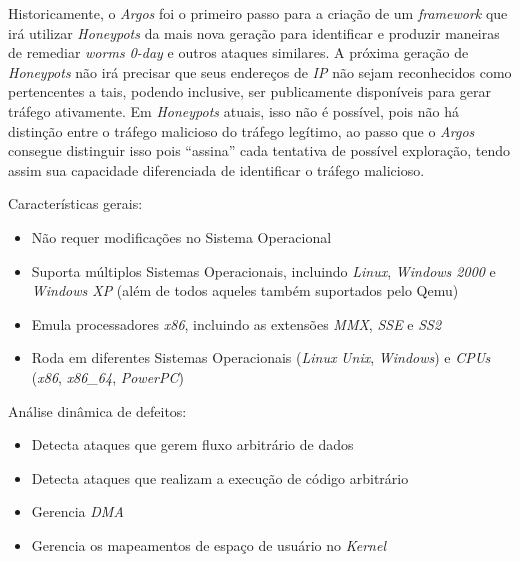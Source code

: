 Historicamente, o \textit{Argos} foi o primeiro passo para a criação de um \textit{framework} que irá utilizar \textit{Honeypots} da mais nova geração para identificar e produzir maneiras de remediar \textit{worms 0-day} e outros ataques similares. A próxima geração de \textit{Honeypots} não irá precisar que seus endereços de \textit{IP} não sejam reconhecidos como pertencentes a tais, podendo inclusive, ser publicamente disponíveis para gerar tráfego ativamente. Em \textit{Honeypots} atuais, isso não é possível, pois não há distinção entre o tráfego malicioso do tráfego legítimo, ao passo que o \textit{Argos} consegue distinguir isso pois ``assina'' cada tentativa de possível exploração, tendo assim sua capacidade diferenciada de identificar o tráfego malicioso.

Características gerais:
\begin{itemize}
    \item Não requer modificações no Sistema Operacional
    \item Suporta múltiplos Sistemas Operacionais, incluindo \textit{Linux}, \textit{Windows 2000} e \textit{Windows XP} (além de todos aqueles também suportados pelo Qemu)
    \item Emula processadores \textit{x86}, incluindo as extensões \textit{MMX}, \textit{SSE} e \textit{SS2}
    \item Roda em diferentes Sistemas Operacionais (\textit{Linux} \/ \textit{Unix}, \textit{Windows}) e \textit{CPUs} (\textit{x86}, \textit{x86\_64}, \textit{PowerPC})
\end{itemize}

Análise dinâmica de defeitos:
\begin{itemize}
    \item Detecta ataques que gerem fluxo arbitrário de dados
    \item Detecta ataques que realizam a execução de código arbitrário
    \item Gerencia \textit{DMA}
    \item Gerencia os mapeamentos de espaço de usuário no \textit{Kernel}
\end{itemize}

